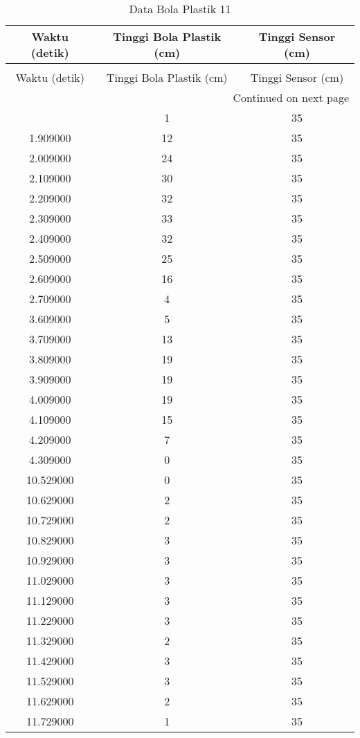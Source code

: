 \begin{longtable}[htbp]{|c|c|c|}
\caption{Data Bola Plastik 11} \\
\hline
Waktu (detik) & Tinggi Bola Plastik (cm) & Tinggi Sensor (cm) \\ \hline
\endfirsthead
\caption[]{Data Bola Plastik 11} \\
\hline
Waktu (detik) & Tinggi Bola Plastik (cm) & Tinggi Sensor (cm) \\ \hline
\endhead
\multicolumn{3}{r}{Continued on next page} \\
\endfoot
\endlastfoot
1.806000 & 1 & 35 \\ \hline
1.909000 & 12 & 35 \\ \hline
2.009000 & 24 & 35 \\ \hline
2.109000 & 30 & 35 \\ \hline
2.209000 & 32 & 35 \\ \hline
2.309000 & 33 & 35 \\ \hline
2.409000 & 32 & 35 \\ \hline
2.509000 & 25 & 35 \\ \hline
2.609000 & 16 & 35 \\ \hline
2.709000 & 4 & 35 \\ \hline
3.609000 & 5 & 35 \\ \hline
3.709000 & 13 & 35 \\ \hline
3.809000 & 19 & 35 \\ \hline
3.909000 & 19 & 35 \\ \hline
4.009000 & 19 & 35 \\ \hline
4.109000 & 15 & 35 \\ \hline
4.209000 & 7 & 35 \\ \hline
4.309000 & 0 & 35 \\ \hline
10.529000 & 0 & 35 \\ \hline
10.629000 & 2 & 35 \\ \hline
10.729000 & 2 & 35 \\ \hline
10.829000 & 3 & 35 \\ \hline
10.929000 & 3 & 35 \\ \hline
11.029000 & 3 & 35 \\ \hline
11.129000 & 3 & 35 \\ \hline
11.229000 & 3 & 35 \\ \hline
11.329000 & 2 & 35 \\ \hline
11.429000 & 3 & 35 \\ \hline
11.529000 & 3 & 35 \\ \hline
11.629000 & 2 & 35 \\ \hline
11.729000 & 1 & 35 \\ \hline
\end{longtable}
